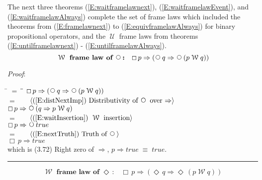 \documentclass[12pt, fleqn, leqno]{article}
\newcommand{\lgap}{2pt}                             %
\newcommand{\mymathindent}{24pt}                    %
\newcommand{\equivs}{\ensuremath{\;\equiv\;}}       %
\newcommand{\impl}{\ensuremath{\Rightarrow}}        %
\newcommand{\Until}{\;\mathcal{U}\;}
\newcommand{\Wait}{\;\mathcal{W}\;}
\newcommand{\Next}{\;\,\text{\raisebox{3.5pt}{\circle{6}}}}
\newcommand{\Event}{\Diamond\,}
\newcommand{\Always}{\Box\,}
\newcommand{\myqed}{\rule[-.23ex]{1.2ex}{2.0ex}}
\newcommand{\myqedtab}{\hspace{384pt}}              %
\newcommand{\Gll} {\langle}                         %
\newcommand{\Ggg} {\rangle}                         %
\newcommand{\Hint}[1]     {\ \ \ $\Gll              \mbox{#1} \Ggg$ }   %
\begin{document}
The next three theorems 
(\ref{E:waitframelawnext}),
(\ref{E:waitframelawEvent}),
and
(\ref{E:waitframelawAlways})
complete the set of frame laws which included the theorems from (\ref{E:framelawnext}) to (\ref{E:equivframelawAlways})
for binary propositional operators,
and the $\Until$ frame laws from theorems (\ref{E:untilframelawnext}) - (\ref{E:untilframelawAlways}).
\begin{equation}\label{E:waitframelawnext}
\textbf{$\Wait$ frame law of $\Next$:}\quad \Always p \impl (\Next q \impl \Next (p \Wait q))
\end{equation}

\emph{Proof}:
\begin{tabbing}
\hspace{\mymathindent} \= $= \;$ \= \myqedtab \= \kill
	\> \>   $\Always p \impl (\Next q \impl \Next (p \Wait q))$\\[\lgap]
	\> $=$  \>  \Hint{(\ref{E:distNextImp}) Distributivity of $\Next$ over $\impl$}\\[\lgap]
	\> \>   $\Always p \impl \Next (q \impl p \Wait q)$\\[\lgap]
	\> $=$  \>  \Hint{(\ref{E:waitInsertion}) $\Wait$ insertion}\\[\lgap]
	\> \>   $\Always p \impl \Next true$\\[\lgap]
	\> $=$  \>  \Hint{(\ref{E:nextTruth}) Truth of $\Next$}\\[\lgap]
	\> \>   $\Always p \impl true$\\[\lgap]
    \> which is (3.72) Right zero of $\impl$, $p\impl true \equivs true$. \quad \myqed
\end{tabbing}
\begin{equation}\label{E:waitframelawEvent}
\textbf{$\Wait$ frame law of $\Event$:}\quad \Always p \impl (\Event q \impl \Event (p \Wait q))
\end{equation}
\end{document}
